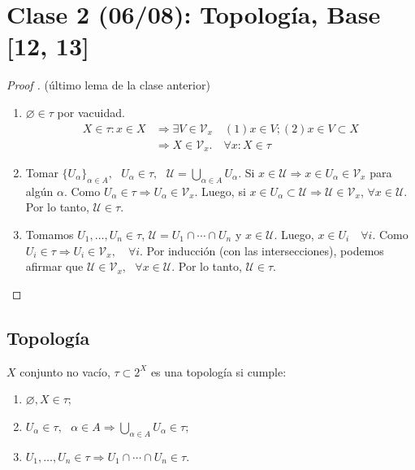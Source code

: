 
	\section{Clase 2 (06/08): Topología, Base [12, 13]}

	\begin{proof}[Proof ] (último lema de la clase anterior)
		\begin{enumerate}
			\item $\varnothing \in \tau$ por vacuidad.
			\begin{align*}
				X \in \tau : x \in X & \Rightarrow \exists V \in \mathcal{V}_x \quad (1) x \in V; (2) x \in V \subset X \\ & \Rightarrow X \in \mathcal{V}_x. \quad \forall x : X \in \tau 
			\end{align*}

			\item Tomar $\{ U_{\alpha} \}_{\alpha \in A}, \text{ } U_{\alpha} \in \tau, \text{ } \mathcal{U} = \bigcup_{\alpha \in A} U_{\alpha}$. Si $x \in \mathcal{U} \Rightarrow x \in U_{\alpha} \in \mathcal{V}_x$ para algún $\alpha$. Como $U_{\alpha} \in \tau \Rightarrow U_{\alpha} \in \mathcal{V}_x$. Luego, si $x \in U_{\alpha} \subset \mathcal{U} \Rightarrow \mathcal{U} \in \mathcal{V}_x$, $\forall x \in \mathcal{U}$. Por lo tanto, $\mathcal{U} \in \tau$.

			\item Tomamos $U_1,\dots,U_n \in \tau$, $\mathcal{U} = U_1 \cap \cdots \cap U_n$ y $x \in \mathcal{U}$. Luego, $x \in U_i \quad \forall i$. Como $U_i \in \tau \Rightarrow U_i \in \mathcal{V}_x, \quad \forall i$. Por inducción (con las intersecciones), podemos afirmar que $\mathcal{U} \in \mathcal{V}_x, \text{ } \forall x \in \mathcal{U}$. Por lo tanto, $\mathcal{U} \in \tau$. 
		\end{enumerate}
	\end{proof}

	\subsection{Topología}

	\begin{definition}[topología]
		$X$ conjunto no vacío, $\tau \subset 2^X$ es una topología si cumple:

		\begin{enumerate}
			\item $\varnothing, X \in \tau$;

			\item $U_{\alpha} \in \tau, \text{ } \alpha \in A \Rightarrow \bigcup_{\alpha \in A} U_{\alpha} \in \tau$;

			\item $U_1,\dots,U_n \in \tau \Rightarrow U_1 \cap \cdots \cap U_n \in \tau$.
		\end{enumerate}
	\end{definition}

